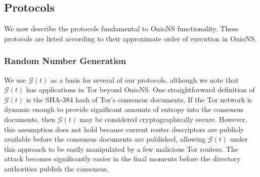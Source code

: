 \documentclass[USenglish,oneside,twocolumn]{article}
\begin{document}






\subsection{Protocols}
\label{sec:protocols}

We now describe the protocols fundamental to OnioNS functionality. These protocols are listed according to their approximate order of execution in OnioNS.


\subsubsection{Random Number Generation} %
\label{sec:rngProcess}

We use $ \mathcal{G}(t) $ as a basis for several of our protocols, although we note that $ \mathcal{G}(t) $ has applications in Tor beyond OnioNS. One straightforward definition of $ \mathcal{G}(t) $ is the SHA-384 hash of Tor's consensus documents. If the Tor network is dynamic enough to provide significant amounts of entropy into the consensus documents, then $ \mathcal{G}(t) $ may be considered cryptographically secure. However, this assumption does not hold because current router descriptors are publicly available before the consensus documents are published, allowing $ \mathcal{G}(t) $ under this approach to be easily manipulated by a few malicious Tor routers. The attack becomes significantly easier in the final moments before the directory authorities publish the consensus.
\end{document}
